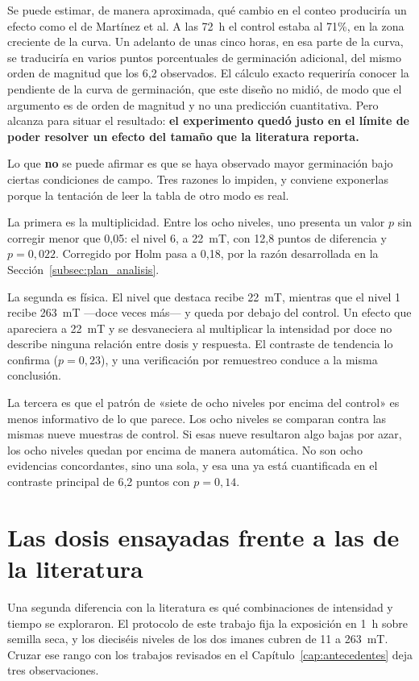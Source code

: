 Se puede estimar, de manera aproximada, qué cambio en el conteo produciría un efecto como el de Martínez et al. A las 72~h el control estaba al 71\%, en la zona creciente de la curva. Un adelanto de unas cinco horas, en esa parte de la curva, se traduciría en varios puntos porcentuales de germinación adicional, del mismo orden de magnitud que los 6{,}2 observados. El cálculo exacto requeriría conocer la pendiente de la curva de germinación, que este diseño no midió, de modo que el argumento es de orden de magnitud y no una predicción cuantitativa. Pero alcanza para situar el resultado: \textbf{el experimento quedó justo en el límite de poder resolver un efecto del tamaño que la literatura reporta.}

Lo que \textbf{no} se puede afirmar es que se haya observado mayor germinación bajo ciertas condiciones de campo. Tres razones lo impiden, y conviene exponerlas porque la tentación de leer la tabla de otro modo es real.

La primera es la multiplicidad. Entre los ocho niveles, uno presenta un valor \(p\) sin corregir menor que 0{,}05: el nivel 6, a 22~mT, con 12{,}8 puntos de diferencia y \(p = 0{,}022\). Corregido por Holm pasa a 0{,}18, por la razón desarrollada en la Sección~\ref{subsec:plan_analisis}.

La segunda es física. El nivel que destaca recibe 22~mT, mientras que el nivel 1 recibe 263~mT ---doce veces más--- y queda por debajo del control. Un efecto que apareciera a 22~mT y se desvaneciera al multiplicar la intensidad por doce no describe ninguna relación entre dosis y respuesta. El contraste de tendencia lo confirma (\(p = 0{,}23\)), y una verificación por remuestreo conduce a la misma conclusión.

La tercera es que el patrón de «siete de ocho niveles por encima del control» es menos informativo de lo que parece. Los ocho niveles se comparan contra las mismas nueve muestras de control. Si esas nueve resultaron algo bajas por azar, los ocho niveles quedan por encima de manera automática. No son ocho evidencias concordantes, sino una sola, y esa una ya está cuantificada en el contraste principal de 6{,}2 puntos con \(p = 0{,}14\).

\section{Las dosis ensayadas frente a las de la literatura}
\label{sec:disc_dosis}

Una segunda diferencia con la literatura es qué combinaciones de intensidad y tiempo se exploraron. El protocolo de este trabajo fija la exposición en 1~h sobre semilla seca, y los dieciséis niveles de los dos imanes cubren de 11 a 263~mT. Cruzar ese rango con los trabajos revisados en el Capítulo~\ref{cap:antecedentes} deja tres observaciones.

